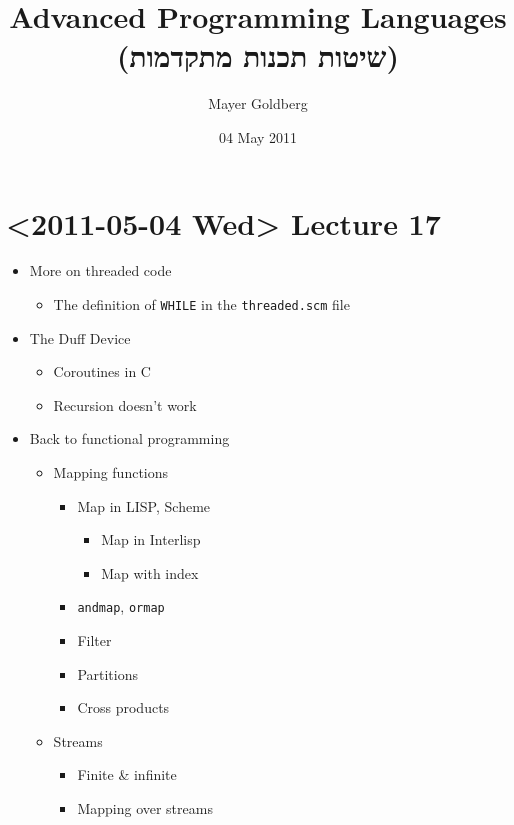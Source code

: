\documentclass[11pt]{article}
\begin{document}
\title{Advanced Programming Languages (שיטות תכנות מתקדמות)}
\author{Mayer Goldberg}
\date{04 May 2011}
\maketitle

\setcounter{tocdepth}{2}
\tableofcontents
\vspace*{1cm}
\section{<2011-05-04 Wed> Lecture 17}
\label{sec-1}

\begin{itemize}
\item More on threaded code

\begin{itemize}
\item The definition of \texttt{WHILE} in the \texttt{threaded.scm} file
\end{itemize}

\item The Duff Device

\begin{itemize}
\item Coroutines in C
\item Recursion doesn't work
\end{itemize}

\item Back to functional programming

\begin{itemize}
\item Mapping functions

\begin{itemize}
\item Map in LISP, Scheme

\begin{itemize}
\item Map in Interlisp
\item Map with index
\end{itemize}

\item \texttt{andmap}, \texttt{ormap}
\item Filter
\item Partitions
\item Cross products
\end{itemize}

\item Streams

\begin{itemize}
\item Finite \& infinite
\item Mapping over streams
\end{itemize}

\end{itemize}

\end{itemize}
\end{document}
